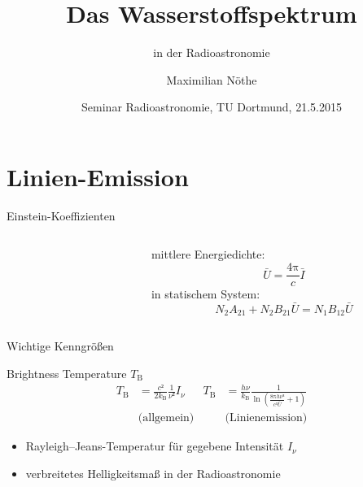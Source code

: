 \documentclass[compress, aspectratio=169]{beamer}
\author{Maximilian Nöthe}
\date[21.5.2015]{Seminar Radioastronomie, TU Dortmund, 21.5.2015}
\title{Das Wasserstoffspektrum}
\subtitle{in der Radioastronomie}
\newcommand\PI{\ensuremath{\mathup{π}}}
\newcommand\kb{\ensuremath{k_\mathup{B}}}
\newcommand\TB{\ensuremath{T_\mathup{B}}}
\begin{document}
\maketitle

\section{Linien-Emission}
\begin{frame}{Einstein-Koeffizienten}
  \begin{columns}[c]%
    \begin{column}{0.5\textwidth}%
    \end{column}%
    \begin{column}{0.5\textwidth}%
      mittlere Energiedichte:
      \begin{equation*}
        \bar{U} = \frac{4\PI}{c} \bar{I}
      \end{equation*}
      in statischem System:
      \begin{equation*}
        N_2 A_{21} + N_2 B_{21} \bar{U} = N_1 B_{12} \bar{U}
      \end{equation*}
    \end{column}%
  \end{columns}%
\end{frame}

\begin{frame}{Wichtige Kenngrößen}
  \begin{block}{Brightness Temperature $T_\mathup{B}$}
    \begin{align*}%
      \TB &= \frac{c²}{2 \kb} \frac{1}{ν²} I_ν & 
      \TB &= \frac{h ν}{k_\mathup{B}}
             \frac{1}{\ln\!\left(
                \frac{8\PI h ν³}{c³\bar{U}} + 1
             \right)} \\
      &\text{(allgemein)} &  &\text{(Linienemission)}
    \end{align*}%
  \begin{itemize}
    \item Rayleigh–Jeans-Temperatur für gegebene Intensität $I_ν$
    \item verbreitetes Helligkeitsmaß in der Radioastronomie
  \end{itemize}
  \end{block}%
\end{frame}
\end{document}
